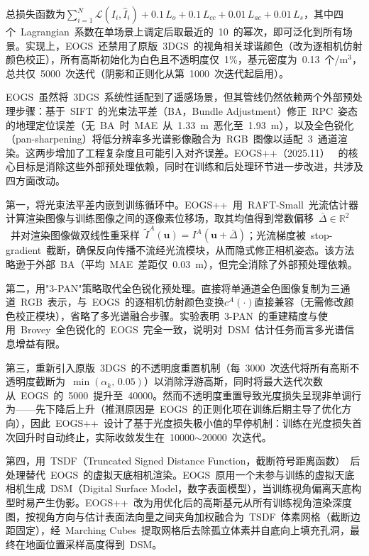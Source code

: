 总损失函数为$\sum_{i=1}^N \mathcal{L}(I_i, \hat{I}_i) + 0.1\,L_o + 0.1\,L_{cc} + 0.01\,L_{ac} + 0.01\,L_s$，其中四个~Lagrangian~系数在单场景上调定后取最近的~10~的幂次，即可泛化到所有场景。实现上，EOGS~还禁用了原版~3DGS~的视角相关球谐颜色（改为逐相机仿射颜色校正），所有高斯初始化为白色且不透明度仅~1\%，基元密度为~0.13~个/m$^3$，总共仅~5000~次迭代（阴影和正则化从第~1000~次迭代起启用）。

EOGS~虽然将~3DGS~系统性适配到了遥感场景，但其管线仍然依赖两个外部预处理步骤：基于~SIFT~的光束法平差（BA，Bundle Adjustment）修正~RPC~姿态的地理定位误差（无~BA~时~MAE~从~1.33~m~恶化至~1.93~m），以及全色锐化（pan-sharpening）将低分辨率多光谱影像融合为~RGB~图像以适配~3~通道渲染。这两步增加了工程复杂度且可能引入对齐误差。EOGS++（2025.11）~\cite{2511_16542} 的核心目标是消除这些外部预处理依赖，同时在训练和后处理环节进一步改进，共涉及四方面改动。

第一，将光束法平差内嵌到训练循环中。EOGS++~用~RAFT-Small~光流估计器计算渲染图像与训练图像之间的逐像素位移场，取其均值得到常数偏移~$\bar{\Delta} \in \mathbb{R}^2$~并对渲染图像做双线性重采样~$\tilde{I}^A(\mathbf{u}) = I^A(\mathbf{u}+\bar{\Delta})$；光流梯度被~stop-gradient~截断，确保反向传播不流经光流模块，从而隐式修正相机姿态。该方法略逊于外部~BA（平均~MAE~差距仅~0.03~m），但完全消除了外部预处理依赖。

第二，用"3-PAN"策略取代全色锐化预处理。直接将单通道全色图像复制为三通道~RGB~表示，与~EOGS~的逐相机仿射颜色变换$c^A(\cdot)$直接兼容（无需修改颜色校正模块），省略了多光谱融合步骤。实验表明~3-PAN~的重建精度与使用~Brovey~全色锐化的~EOGS~完全一致，说明对~DSM~估计任务而言多光谱信息增益有限。

第三，重新引入原版~3DGS~的不透明度重置机制（每~3000~次迭代将所有高斯不透明度截断为~$\min(\alpha_k,\, 0.05)$）以消除浮游高斯，同时将最大迭代次数从~EOGS~的~5000~提升至~40000。然而不透明度重置导致光度损失呈现非单调行为——先下降后上升（推测原因是~EOGS~的正则化项在训练后期主导了优化方向），因此~EOGS++~设计了基于光度损失极小值的早停机制：训练在光度损失首次回升时自动终止，实际收敛发生在~10000$\sim$20000~次迭代。

第四，用~TSDF（Truncated Signed Distance Function，截断符号距离函数）~后处理替代~EOGS~的虚拟天底相机渲染。EOGS~原用一个未参与训练的虚拟天底相机生成~DSM（Digital Surface Model，数字表面模型），当训练视角偏离天底构型时易产生伪影。EOGS++~改为用优化后的高斯基元从所有训练视角渲染深度图，按视角方向与估计表面法向量之间夹角加权融合为~TSDF~体素网格（截断边距固定），经~Marching Cubes~提取网格后去除孤立体素并自底向上填充孔洞，最终在地面位置采样高度得到~DSM。

